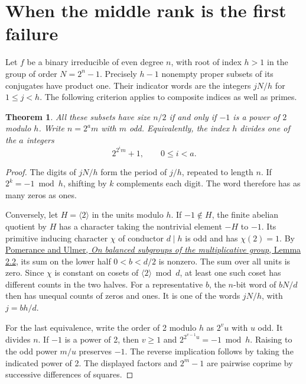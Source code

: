 \documentclass[11pt]{article}
\newtheorem{theorem}{Theorem}
\begin{document}
\section{When the middle rank is the first failure}\label{sec:middle-rank-twists}
Let \(f\) be a binary irreducible of even degree \(n\), with root of
index \(h>1\) in the group of order \(N=2^n-1\). Precisely \(h-1\)
nonempty proper subsets of its conjugates have product one. Their
indicator words are the integers \(jN/h\) for \(1\le j<h\).
The following criterion applies to composite indices as well as primes.

\begin{theorem}\label{thm:middle-index}
All these subsets have size \(n/2\) if and only if \(-1\) is a power
of \(2\) modulo \(h\). Write \(n=2^a m\) with \(m\) odd. Equivalently,
the index \(h\) divides one of the \(a\) integers
\[
               2^{2^i m}+1,\qquad 0\le i<a .
\]
\end{theorem}
\begin{proof}
The digits of \(jN/h\) form the period of \(j/h\), repeated to length
\(n\). If \(2^k=-1\bmod h\), shifting by \(k\) complements each
digit. The word therefore has as many zeros as ones.

Conversely, let \(H=\langle2\rangle\) in the units modulo \(h\).
If \(-1\notin H\), the finite abelian quotient by \(H\) has a
character taking the nontrivial element \(-H\) to \(-1\). Its
primitive inducing character \(\chi\) of conductor \(d\mid h\)
is odd and has \(\chi(2)=1\). By
\href{https://math.dartmouth.edu/~carlp/b2012-09-17.pdf\#page=3}{Pomerance
and Ulmer, \emph{On balanced subgroups of the multiplicative group},
Lemma 2.2}, its sum on the lower half \(0<b<d/2\) is nonzero.
The sum over all units is zero. Since \(\chi\) is constant on cosets
of \(\langle2\rangle\bmod d\), at least one such coset has different
counts in the two halves. For a representative \(b\), the \(n\)-bit
word of \(bN/d\) then has unequal counts of zeros and ones. It is one
of the words \(jN/h\), with \(j=bh/d\).

For the last equivalence, write the order of 2 modulo \(h\) as
\(2^v u\) with \(u\) odd. It divides \(n\). If \(-1\) is a power of
2, then \(v\ge1\) and \(2^{2^{v-1}u}=-1\bmod h\). Raising to the
odd power \(m/u\) preserves \(-1\). The reverse implication follows
by taking the indicated power of 2. The displayed factors and
\(2^m-1\) are pairwise coprime by successive differences of squares.
\end{proof}
\end{document}

